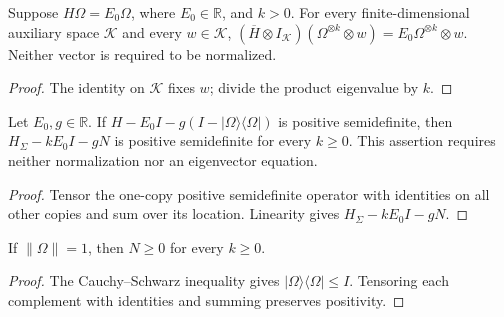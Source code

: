 \begin{theorem}
\label{thm:replica_auxiliary_eigenvector}
\leanok
{}
Suppose $H\Omega=E_0\Omega$, where $E_0\in\mathbb R$, and $k>0$.
For every finite-dimensional auxiliary space $\mathcal K$ and every
$w\in\mathcal K$,
$(\overline H\otimes I_{\mathcal K})(\Omega^{\otimes k}\otimes w)
=E_0\Omega^{\otimes k}\otimes w$.
Neither vector is required to be normalized.
\end{theorem}
\begin{proof}
\leanok
{}
The identity on $\mathcal K$ fixes $w$; divide the product eigenvalue by $k$.
\end{proof}

\begin{theorem}
\label{thm:replica_gap}
\leanok
{}
Let $E_0,g\in\mathbb R$. If
$H-E_0I-g(I-|\Omega\rangle\langle\Omega|)$ is positive semidefinite, then
$H_\Sigma-kE_0I-gN$ is positive semidefinite for every $k\ge0$.
This assertion requires neither normalization nor an eigenvector equation.
\end{theorem}
\begin{proof}
\leanok
Tensor the one-copy positive semidefinite operator with identities on all
other copies and sum over its location. Linearity gives
$H_\Sigma-kE_0I-gN$.
\end{proof}

\begin{theorem}
\label{thm:replica_defect_positive}
\leanok
{}
If $\|\Omega\|=1$, then $N\ge0$ for every $k\ge0$.
\end{theorem}
\begin{proof}
\leanok
The Cauchy--Schwarz inequality gives
$|\Omega\rangle\langle\Omega|\le I$. Tensoring each complement with
identities and summing preserves positivity.
\end{proof}

